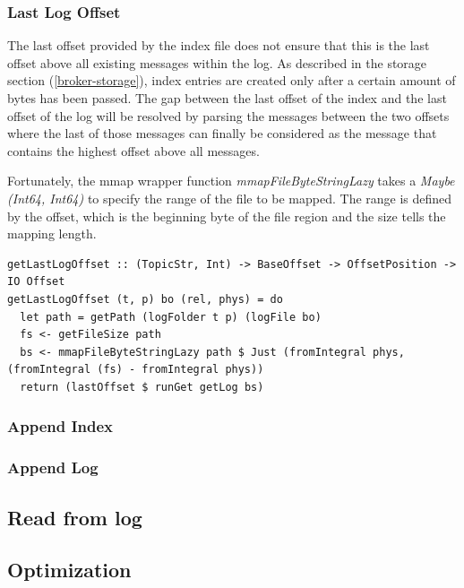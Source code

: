 
\subsubsection{Last Log Offset}

The last offset provided by the index file does not ensure that this is the
last offset above all existing messages within the log. As described in the
storage section (\ref{broker-storage}), index entries are created only after a
certain amount of bytes has been passed. The gap between the last offset of the
index and the last offset of the log will be resolved by parsing the messages
between the two offsets where the last of those messages can finally be
considered as the message that contains the highest offset above all messages. 

Fortunately, the mmap wrapper function \textit{mmapFileByteStringLazy} takes a
\textit{Maybe (Int64, Int64)} to specify the range of the file to be mapped.
The range is defined by the offset, which is the beginning byte of the file
region and the size tells the mapping length.

\begin{lstlisting}
getLastLogOffset :: (TopicStr, Int) -> BaseOffset -> OffsetPosition -> IO Offset
getLastLogOffset (t, p) bo (rel, phys) = do
  let path = getPath (logFolder t p) (logFile bo)
  fs <- getFileSize path
  bs <- mmapFileByteStringLazy path $ Just (fromIntegral phys, (fromIntegral (fs) - fromIntegral phys))
  return (lastOffset $ runGet getLog bs)
\end{lstlisting}

\subsubsection{Append Index}

\subsubsection{Append Log}


\subsection{Read from log}

\subsection{Optimization}

